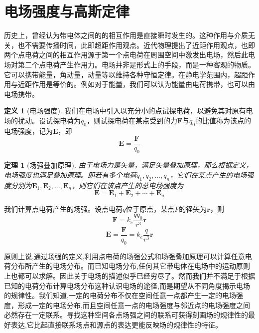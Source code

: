 \documentclass[12pt,a4paper,oneside]{report}
\newtheorem{theorem}{定理}[chapter]
\theoremstyle{definition}
\newtheorem{definition}{定义}[chapter]
\theoremstyle{remark}
\begin{document}
\section{电场强度与高斯定律}

历史上，曾经认为带电体之间的的相互作用是直接瞬时发生的。这种作用与介质无关，也不需要传播时间，此即超距作用观点。近代物理提出了近距作用观点，也即两个点电荷之间的相互作用源于第一个点电荷在周围空间中激发出电场，然后此电场对第二个点电荷产生作用力。电场并非是形式上的手段，而是一种客观的物质。它可以携带能量，角动量，动量等以维持各种守恒定律。在静电学范围内，超距作用与近距作用是等价的。例如对于能量，我们可以认为能量由电荷携带，也可以由电场携带。

\begin{definition}[电场强度]
  我们在电场中引入以充分小的点试探电荷，以避免其对原有电场的扰动。设试探电荷为$q_0$，则试探电荷在某点受到的力$\mathbf{F}$与$q_0$的比值称为该点的电场强度，记为$\mathbf{E}$，即
  \[
  \mathbf{E} = \frac{\mathbf{F}}{q_0}
  \]
\end{definition}
\begin{theorem}[场强叠加原理]
  由于电场力是矢量，满足矢量叠加原理，那么根据定义，电场强度也满足叠加原理。即若有多个电荷$q_1,q_2,\ldots,q_n$，它们在某点产生的电场强度分别为$\mathbf{E}_1,\mathbf{E}_2,\ldots,\mathbf{E}_n$，则它们在该点产生的总电场强度为
  \[
  \mathbf{E} = \mathbf{E}_1 + \mathbf{E}_2 + \cdots + \mathbf{E}_n
  \]
\end{theorem}

我们计算点电荷产生的场强。设点电荷$q$位于原点，某点$P$的径矢为$\mathbf{r}$，则
\[
\mathbf{F} = k_e \frac{q q_0}{r^3}\mathbf{r}
\]
\[
\mathbf{E} = \frac{\mathbf{F}}{q_0} = k_e \frac{q}{r^3}\mathbf{r}
\]

原则上说,通过场强的定义,利用点电荷的场强公式和场强叠加原理可以计算任意电荷分布所产生的电场分布。而已知电场分布,任何其它带电体在电场中的运动原则上也都可以求解。因此关于电场的描述似乎已经穷尽了。然而我们并不满足于根据已知的电荷分布计算电场分布这种认识电场的途径,而是期望从不同角度揭示电场的规律性。我们知道,一定的电荷分布不仅在空间任意一点都产生一定的电场强度，形成一定的电场分布,而且空间任意一点的电场强度与邻近点的电场强度之间必然存在一定联系。寻找这种空间各点场强之间的联系可获得刻画场的规律性的最好表达,它比起直接联系场点和源点的表达更能反映场的规律性的特征。
\end{document}
